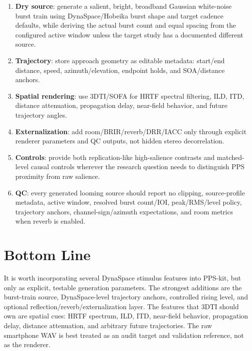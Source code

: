 \documentclass[10pt]{article}
\begin{document}
\begin{enumerate}
  \item \textbf{Dry source}: generate a salient, bright, broadband Gaussian white-noise burst train using DynaSpace/Hobeika burst shape and target cadence defaults, while deriving the actual burst count and equal spacing from the configured active window unless the target study has a documented different source.
  \item \textbf{Trajectory}: store approach geometry as editable metadata: start/end distance, speed, azimuth/elevation, endpoint holds, and SOA/distance anchors.
  \item \textbf{Spatial rendering}: use 3DTI/SOFA for HRTF spectral filtering, ILD, ITD, distance attenuation, propagation delay, near-field behavior, and future trajectory angles.
  \item \textbf{Externalization}: add room/BRIR/reverb/DRR/IACC only through explicit renderer parameters and QC outputs, not hidden stereo decorrelation.
  \item \textbf{Controls}: provide both replication-like high-salience contrasts and matched-level causal controls wherever the research question needs to distinguish PPS proximity from raw salience.
  \item \textbf{QC}: every generated looming source should report no clipping, source-profile metadata, active window, resolved burst count/IOI, peak/RMS/level policy, trajectory anchors, channel-sign/azimuth expectations, and room metrics when reverb is enabled.
\end{enumerate}

\section*{Bottom Line}

It is worth incorporating several DynaSpace stimulus features into PPS-kit, but only as explicit, testable generation parameters. The strongest additions are the burst-train source, DynaSpace-level trajectory anchors, controlled rising level, and optional reflection/reverb/externalization layer. The features that 3DTI should own are spatial cues: HRTF spectrum, ILD, ITD, near-field behavior, propagation delay, distance attenuation, and arbitrary future trajectories. The raw smartphone WAV is best treated as an audit target and validation reference, not as the renderer.
\end{document}

